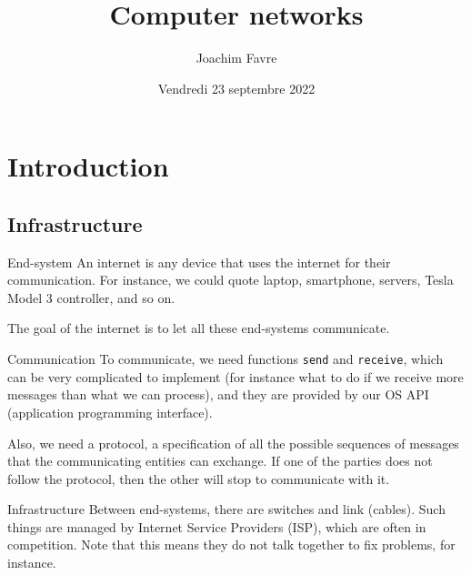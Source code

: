 \documentclass[a4paper]{article}
\title{Computer networks}
\author{Joachim Favre}
\date{Vendredi 23 septembre 2022}
\begin{document}
\maketitle


\section{Introduction}
\subsection{Infrastructure}

\begin{parag}{End-system}
    An internet  is any device that uses the internet for their communication. For instance, we could quote laptop, smartphone, servers, Tesla Model 3 controller, and so on.

    The goal of the internet is to let all these end-systems communicate.
\end{parag}

\begin{parag}{Communication}
    To communicate, we need functions \texttt{send} and \texttt{receive}, which can be very complicated to implement (for instance what to do if we receive more messages than what we can process), and they are provided by our OS API (application programming interface).

    Also, we need a protocol, a specification of all the possible sequences of messages that the communicating entities can exchange. If one of the parties does not follow the protocol, then the other will stop to communicate with it.

\end{parag}

\begin{parag}{Infrastructure}
    Between end-systems, there are switches and link (cables). Such things are managed by Internet Service Providers (ISP), which are often in competition. Note that this means they do not talk together to fix problems, for instance. 
\end{parag}
\end{document}
